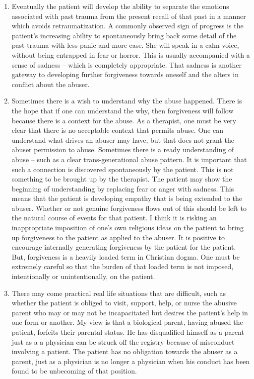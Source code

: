 \documentclass[]{book}
\begin{document}
\begin{enumerate}
\item
  Eventually the patient will develop the ability to separate the emotions associated with past trauma from the present recall of that past in a manner which avoids retraumatization. A commonly observed sign of progress is the patient's increasing ability to spontaneously bring back some detail of the past trauma with less panic and more ease. She will speak in a calm voice, without being entrapped in fear or horror. This is usually accompanied with a sense of sadness -- which is completely appropriate. That sadness is another gateway to developing further forgiveness towards oneself and the alters in conflict about the abuser.
\item
  Sometimes there is a wish to understand why the abuse happened. There is the hope that if one can understand the why, then forgiveness will follow because there is a context for the abuse. As a therapist, one must be very clear that there is no acceptable context that permits abuse. One can understand what drives an abuser may have, but that does not grant the abuser permission to abuse. Sometimes there is a ready understanding of abuse -- such as a clear trans-generational abuse pattern. It is important that such a connection is discovered spontaneously by the patient. This is not something to be brought up by the therapist. The patient may show the beginning of understanding by replacing fear or anger with sadness. This means that the patient is developing empathy that is being extended to the abuser. Whether or not genuine forgiveness flows out of this should be left to the natural course of events for that patient. I think it is risking an inappropriate imposition of one's own religious ideas on the patient to bring up forgiveness to the patient as applied to the abuser. It is positive to encourage internally generating forgiveness by the patient for the patient. But, forgiveness is a heavily loaded term in Christian dogma. One must be extremely careful so that the burden of that loaded term is not imposed, intentionally or unintentionally, on the patient.
\item
  There may come practical real life situations that are difficult, such as whether the patient is obliged to visit, support, help, or nurse the abusive parent who may or may not be incapacitated but desires the patient's help in one form or another. My view is that a biological parent, having abused the patient, forfeits their parental status. He has disqualified himself as a parent just as a a physician can be struck off the registry because of misconduct involving a patient. The patient has no obligation towards the abuser as a parent, just as a physician is no longer a physician when his conduct has been found to be unbecoming of that position.
\end{enumerate}
\end{document}
